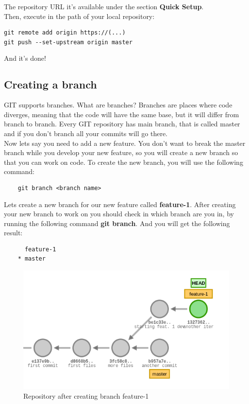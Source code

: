 \documentclass{article}
\begin{document}
The repository URL it's available under the section \textbf{Quick Setup}.\\

Then, execute in the path of your local repository:

\begin{lstlisting}
git remote add origin https://(...)
git push --set-upstream origin master
\end{lstlisting}

And it's done!

\subsection{Creating a branch}

GIT supports branches. What are branches? Branches are places where code diverges, meaning that the code will have the same base, but it will differ from branch to branch. Every GIT repository has main branch, that is called master and if you don't branch all your commits will go there.\\

Now lets say you need to add a new feature. You don't want to break the master branch while you develop your new feature, so you will create a new branch so that you can work on code. To create the new branch, you will use the following command:

\begin{lstlisting}
	git branch <branch name>
\end{lstlisting}

Lets create a new branch for our new feature called \textbf{feature-1}. After creating your new branch to work on you should check in which branch are you in, by running the following command \textbf{git branch}. And you will get the following result:

\begin{lstlisting}
	  feature-1
	* master
\end{lstlisting}

\begin{figure}[H]
\centerline{\includegraphics[scale=0.5]{repository_after_branch.png}}
\caption{Repository after creating branch feature-1}
\label{fig1}
\end{figure}
\end{document}
